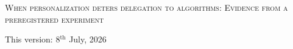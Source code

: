 \documentclass[a4paper, 12pt, fleqn]{article}
\title{\mytitle}
\date{}
\theoremstyle{definition}
\newcommand{\symbolfootnote}[1]{\begingroup%
\renewcommand{\thefootnote}{\fnsymbol{footnote}}\footnote{#1}\endgroup}
\newcommand{\mytitle}{{\Large \textsc{When personalization deters delegation to algorithms: Evidence from a preregistered experiment}}}
\begin{document}
 
\thispagestyle{empty}
\begin{center}
	\mytitle%
  \vspace{.55cm}\\
 \begin{small}
 {This version: 8$^{\text{th}}$ July, 2026}
\vspace{.6cm}
\end{small}
\end{center}
\end{document}
